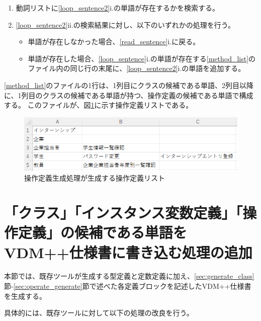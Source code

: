 \begin{enumerate}
\begin{enumerate}
\begin{enumerate}
                    \item 動詞リストに\ref{loop_sentence2}i.の単語が存在するかを検索する。
                    \label{search_doshi_word}
                    \item \ref{loop_sentence2}ii.の検索結果に対し、以下のいずれかの処理を行う。
                        \begin{itemize}
                            \item 単語が存在しなかった場合、\ref{read_sentence}i.に戻る。
                            \item 単語が存在した場合、\ref{loop_sentence}i.の単語が存在する\ref{method_list}のファイル内の同じ行の末尾に、\ref{loop_sentence2}i.の単語を追加する。
                        \end{itemize}
                \end{enumerate}
        \end{enumerate}
\end{enumerate}

\ref{method_list}のファイルの1行は、1列目にクラスの候補である単語、2列目以降に、1列目のクラスの候補である単語が持つ、操作定義の候補である単語で構成する。
このファイルが、図\ref{fig:operate_list}に示す操作定義リストである。

\begin{figure}[t]
    \begin{center}
        \includegraphics[width=1.0\columnwidth]{image/operate_list.png}
        \caption{操作定義生成処理が生成する操作定義リスト}
        \label{fig:operate_list}
    \end{center}
\end{figure}

\section{「クラス」「インスタンス変数定義」「操作定義」の候補である単語をVDM++仕様書に書き込む処理の追加}
本節では、既存ツールが生成する型定義と定数定義に加え、\ref{sec:generate_class}節-\ref{sec:operate_generate}節で述べた各定義ブロックを記述したVDM++仕様書を生成する。

具体的には、既存ツールに対して以下の処理の改良を行う。

